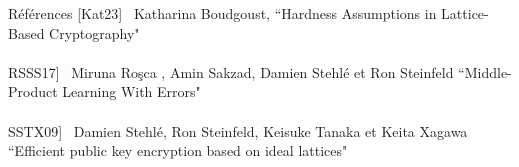\documentclass[10 pt, a4paper]{beamer}
\begin{document}
\begin{frame}{Références}
[Kat23] \ Katharina Boudgoust, ``Hardness Assumptions in Lattice-Based Cryptography" \\ ~ \\
RSSS17] \ Miruna Roşca , Amin Sakzad, Damien Stehlé et Ron Steinfeld ``Middle-Product Learning With Errors"\\ ~ \\
SSTX09] \ Damien Stehlé, Ron Steinfeld, Keisuke Tanaka et Keita Xagawa “Efficient public key encryption based on ideal lattices"
\end{frame}
\end{document}
